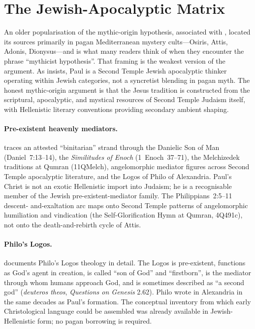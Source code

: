 \documentclass[12pt,oneside]{article}
\begin{document}
\section{The Jewish-Apocalyptic Matrix}

An older popularisation of the mythic-origin hypothesis, associated
with \citet{Frazer1890}, located its sources primarily in pagan
Mediterranean mystery cults---Osiris, Attis, Adonis, Dionysus---and
is what many readers think of when they encounter the phrase
\enquote{mythicist hypothesis}.  That framing is the weakest
version of the argument.  As \citet{Fredriksen2017,Fredriksen2018}
insists, Paul is a Second Temple Jewish apocalyptic thinker
operating within Jewish categories, not a syncretist blending in
pagan myth.  The honest mythic-origin argument is that the Jesus
tradition is constructed from the scriptural, apocalyptic, and
mystical resources of Second Temple Judaism itself, with Hellenistic
literary conventions providing secondary ambient shaping.

\paragraph{Pre-existent heavenly mediators.}
\citet{Boyarin2012} traces an attested \enquote{binitarian} strand
through the Danielic Son of Man (Daniel~7:13--14), the
\textit{Similitudes of Enoch} (1~Enoch~37--71), the Melchizedek
traditions at Qumran (11QMelch), angelomorphic mediator figures
across Second Temple apocalyptic literature, and the Logos of
Philo of Alexandria.  Paul's Christ is not an exotic Hellenistic
import into Judaism; he is a recognisable member of the Jewish
pre-existent-mediator family.  The Philippians~2:5--11 descent-
and-exaltation arc maps onto Second Temple patterns of
angelomorphic humiliation and vindication (the Self-Glorification
Hymn at Qumran, 4Q491c), not onto the death-and-rebirth cycle of
Attis.

\paragraph{Philo's Logos.}
\citet{Sterling2001} documents Philo's Logos theology in detail.
The Logos is pre-existent, functions as God's agent in creation,
is called \enquote{son of God} and \enquote{firstborn}, is the
mediator through whom humans approach God, and is sometimes
described as \enquote{a second god} (\textit{deuteros theos},
\textit{Questions on Genesis} 2.62).  Philo wrote in Alexandria in
the same decades as Paul's formation.  The conceptual inventory
from which early Christological language could be assembled was
already available in Jewish-Hellenistic form; no pagan borrowing
is required.
\end{document}
